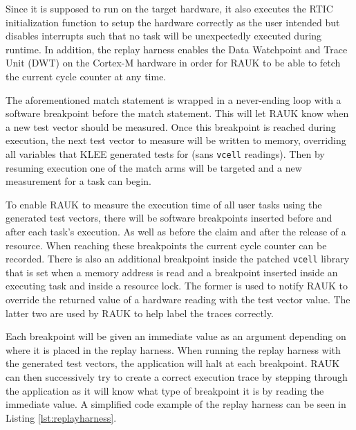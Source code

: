Since it is supposed to run on the target hardware, it also executes the RTIC
initialization function to setup the hardware correctly as the user intended
but disables interrupts such that no task will be unexpectedly executed during
runtime. In addition, the replay harness enables the Data Watchpoint and Trace
Unit (DWT) on the Cortex-M hardware in order for RAUK to be able to fetch the
current cycle counter at any time.

The aforementioned match statement is wrapped in a never-ending loop with a
software breakpoint before the match statement. This will let RAUK know when a
new test vector should be measured. Once this breakpoint is reached during
execution, the next test vector to measure will be written to memory,
overriding all variables that KLEE generated tests for (sans \texttt{vcell}
readings). Then by resuming execution one of the match arms will be targeted
and a new measurement for a task can begin.

To enable RAUK to measure the execution time of all user tasks using the
generated test vectors, there will be software breakpoints inserted before and
after each task's execution. As well as before the claim and after the release
of a resource. When reaching these breakpoints the current cycle counter can be
recorded. There is also an additional breakpoint inside the patched
\texttt{vcell} library that is set when a memory address is read and a breakpoint
inserted inside an executing task and inside a resource lock. The former is
used to notify RAUK to override the returned value of a hardware reading with
the test vector value. The latter two are used by RAUK to help label the
traces correctly.



Each breakpoint will be given an immediate value as an argument depending on
where it is placed in the replay harness. When running the replay harness with
the generated test vectors, the application will halt at each breakpoint. RAUK
can then successively try to create a correct execution trace by stepping
through the application as it will know what type of breakpoint it is by reading
the immediate value. A simplified code example of the replay harness can be
seen in Listing \ref{lst:replayharness}.

